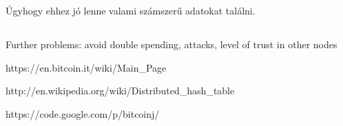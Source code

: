 \documentclass[a4paper,12pt]{article}
\begin{document}
Úgyhogy ehhez jó lenne valami számszerű adatokat találni.


\subsection{}
Further problems: avoid double spending, attacks, level of trust in other nodes




\newpage
\begin{thebibliography}{9}
\bibitem{}
https://en.bitcoin.it/wiki/Main\_Page
\label{bitcoinwiki}

\bibitem{}
http://en.wikipedia.org/wiki/Distributed\_hash\_table
\label{dhtwiki}

\bibitem{}
https://code.google.com/p/bitcoinj/
\label{bitcoinj}

\end{thebibliography}
\end{document}
